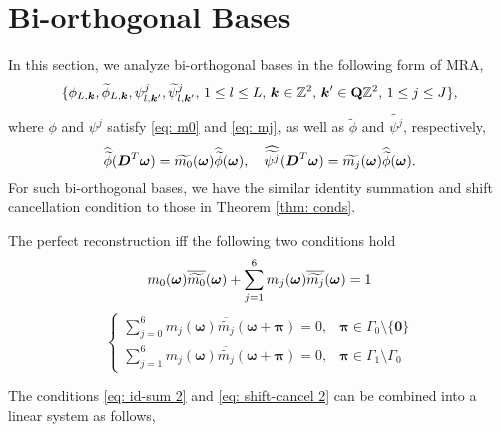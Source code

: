 \section{Bi-orthogonal Bases}\label{sec: bi-orth}
In this section, we analyze bi-orthogonal bases in the following form of MRA,
\begin{align}\label{eq: bi-orth MRA}
\{\phi_{L,\boldsymbol{k}},\widetilde{\phi}_{L,\boldsymbol{k}}, \psi_{l,\boldsymbol{k}'}^j,\widetilde{\psi}_{l,\boldsymbol{k}'}^j,\, 1\leq l\leq L,\,\boldsymbol{k}\in\mathbb{Z}^2,\, \boldsymbol{k}'\in\mathbf{Q}\mathbb{Z}^2,\,1\leq j\leq J \},
\end{align}
where $\phi$ and $\psi^j$ satisfy \eqref{eq: m0} and \eqref{eq: mj}, as well as $\widetilde{\phi}$ and $\widetilde{\psi^j}$, respectively,
$$\widehat{\widetilde{\phi}}(\boldsymbol{D}^T\boldsymbol{\omega}) = \widetilde{m_0}(\boldsymbol{\omega})\widehat{\widetilde{\phi}}(\boldsymbol{\omega}),\quad \widehat{\widetilde{\psi^j}}(\boldsymbol{D}^T\boldsymbol{\omega}) = \widetilde{m_j}(\boldsymbol{\omega})\widehat{\widetilde{\phi}}(\boldsymbol{\omega}).$$
For such bi-orthogonal bases, we have the similar identity summation and shift cancellation condition to those in Theorem \ref{thm: conds}.
\begin{thm}\label{thm: bi-orth conds}
The perfect reconstruction iff the following two conditions hold
\begin{align}\label{eq: id-sum 2}
m_0(\boldsymbol{\omega})\overline{\widetilde{m_{0}}}(\boldsymbol{\omega}) + \sum_{j = 1}^6 m_j(\boldsymbol{\omega})\overline{\widetilde{m_{j}}}(\boldsymbol{\omega}) = 1
\end{align}
\begin{equation}\label{eq: shift-cancel 2}
\begin{cases}
\sum_{j = 0}^6m_j(\boldsymbol{\omega})\overline{\widetilde{m_j}}(\boldsymbol{\omega} + \boldsymbol{\pi}) = 0, & \boldsymbol{\pi}\in \Gamma_0\setminus\{\boldsymbol{0}\}\\[.5em]
\sum_{j=1}^6m_j(\boldsymbol{\omega})\overline{\widetilde{m_j}}(\boldsymbol{\omega}+\boldsymbol{\pi}) = 0, & \boldsymbol{\pi}\in\Gamma_1\setminus\Gamma_0
\end{cases}
\end{equation}
\end{thm}
The conditions \eqref{eq: id-sum 2} and \eqref{eq: shift-cancel 2} can be combined into a linear system as follows,
